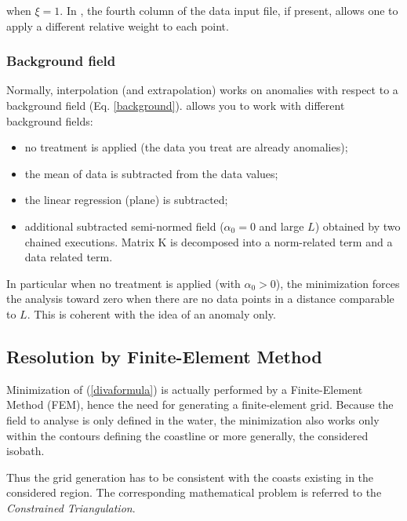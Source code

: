 when $\xi=1$. In  \diva, the fourth column of the data input file, if present, allows one 
to apply a different relative weight to each point. 


\subsubsection{Background field\label{sec:backgroundfield}}

Normally, interpolation (and extrapolation) works on anomalies with respect to a background field (Eq. \ref{background}). \diva allows you to work with different background fields:

\begin{itemize}
\item no treatment is applied (the data you treat are already anomalies);
\item the mean of data is subtracted from the data values;
\item the linear regression (plane) is subtracted;
\item additional subtracted semi-normed field ($\alpha_0=0$ and large $L$) obtained by two chained \diva executions. Matrix K is decomposed into a norm-related term and a data related term.
\end{itemize}

In particular when no treatment is applied (with $\alpha_0 > 0$), the minimization forces the analysis toward zero when there are no
data points in a distance comparable to $L$. This is coherent with the idea of an anomaly only.

\subsection{Resolution by Finite-Element Method}

Minimization of (\ref{divaformula}) is actually performed by a Finite-Element Method (FEM), hence the need for generating a finite-element grid. 
Because the field to analyse is only defined in the water, the minimization also works only within the contours defining the coastline or more generally, the considered isobath.

Thus the grid generation has to be consistent with the coasts existing in the considered region. The corresponding mathematical problem is referred to the \textit{Constrained Triangulation}. %



